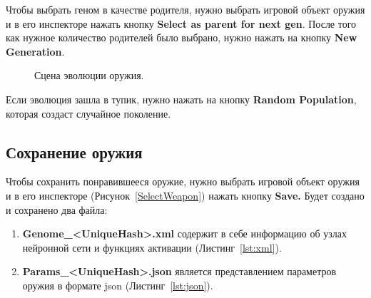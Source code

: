 Чтобы выбрать геном в качестве родителя, нужно выбрать игровой объект оружия и в его инспекторе нажать кнопку {\small \textbf{Select as parent for next gen}}. После того как нужное количество родителей было выбрано, нужно нажать на кнопку {\small \textbf{New Generation}}.

\begin{figure}[ht]
    \begin{center}

        \caption{
            \label{EvoScene}
            Сцена эволюции оружия.}
    \end {center}
\end {figure}

Если эволюция зашла в тупик, нужно нажать на кнопку {\small \textbf{Random Population}}, которая создаст случайное поколение.

\subsection{Сохранение оружия}

Чтобы сохранить понравившееся оружие, нужно выбрать игровой объект оружия и в его инспекторе (Рисунок~\ref{SelectWeapon}) нажать кнопку {\small \textbf{Save.}} Будет создано и сохранено два файла:

\begin{enumerate}[label=\textbullet]
    \item {\small \textbf{Genome\_<UniqueHash>.xml}} содержит в себе информацию об узлах нейронной сети и функциях активации (Листинг~\ref{lst:xml}).
    \item {\small \textbf{Params\_<UniqueHash>.json}} является представлением параметров оружия в формате json (Листинг~\ref{lst:json}).
\end{enumerate}


